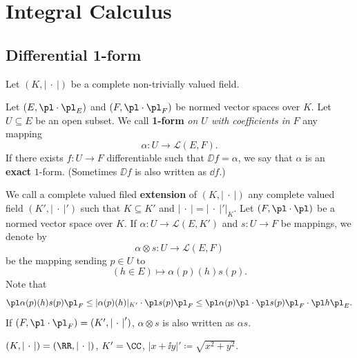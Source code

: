 \chapter{Integral Calculus}

\section{Differential 1-form}
\begin{definitionenv}
    Let $(K,\left|\ \cdot\ \right|)$ be a complete non-trivially valued field.
    
    Let $(E,\pl\cdot\pl_E)$ and $(F,\pl\cdot\pl_F)$ be normed vector spaces over $K$.
    Let $U\subseteq E$ be an open subset. We call \textbf{1-form} \textit{on $U$ with coefficients in} $F$ any mapping
    $$ \alpha: U\longrightarrow \mathscr{L}(E,F).$$
    If there exists $f:U\longrightarrow F$ differentiable such that $\DD f=\alpha$, we say that $\alpha$ is an \textbf{exact} $1$-form. (Sometimes $\DD f$ is also written as $\dd f$.)
\end{definitionenv}
\begin{definitionenv}
    We call a complete valued filed \textbf{extension} of $(K,\left|\ \cdot\ \right|)$ any complete valued field $(K',\left|\ \cdot\ \right|')$ such that $K\subseteq K'$ and $\left| \ \cdot\ \right|=\left| \ \cdot\ \right|'|_K$.
    \newline
    Let $(F,\pl\cdot\pl)$ be a normed vector space over $K$. If $\alpha: U\longrightarrow \mathscr{L}(E,K')$ and $s: U\longrightarrow F$ be mappings, we denote by 
    $$ \alpha\otimes s: U\longrightarrow \mathscr{L}(E,F)$$
    be the mapping sending $p\in U$ to
    $$ (h\in E)\longmapsto \alpha(p)(h)s(p).$$
    Note that 
    $$\pl \alpha(p)(h)s(p)\pl_F\le | \alpha(p)(h)|_{K'}\cdot\pl s(p)\pl_F\le \pl \alpha(p)\pl \cdot\pl s(p)\pl_F\cdot\pl h\pl_E.$$
    If $(F,\pl\cdot\pl_F)=(K',\left|\ \cdot\ \right|')$, $\alpha\otimes s$ is also written as $\alpha s$.
\end{definitionenv}
\begin{exampleenv}
    $(K,\left|\ \cdot\ \right|)=(\RR,\left|\ \cdot\ \right|)$, $K'=\CC$, $|x+\ii y|'\coloneq\sqrt{x^2+y^2}$.
\end{exampleenv}
